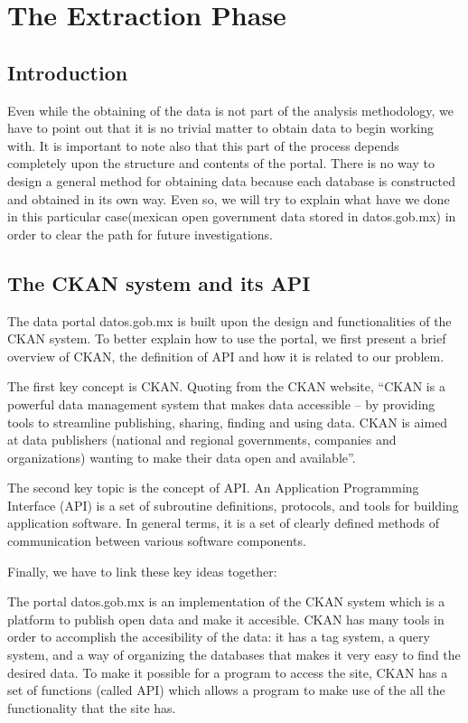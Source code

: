 \documentclass[]{book}
\begin{document}
\chapter{The Extraction Phase}\label{the-extraction-phase}

\section{Introduction}\label{introduction-1}

Even while the obtaining of the data is not part of the analysis
methodology, we have to point out that it is no trivial matter to obtain
data to begin working with. It is important to note also that this part
of the process depends completely upon the structure and contents of the
portal. There is no way to design a general method for obtaining data
because each database is constructed and obtained in its own way. Even
so, we will try to explain what have we done in this particular
case(mexican open government data stored in datos.gob.mx) in order to
clear the path for future investigations.

\section{The CKAN system and its API}\label{the-ckan-system-and-its-api}

The data portal datos.gob.mx is built upon the design and
functionalities of the CKAN system. To better explain how to use the
portal, we first present a brief overview of CKAN, the definition of API
and how it is related to our problem.

The first key concept is CKAN. Quoting from the CKAN website, ``CKAN is
a powerful data management system that makes data accessible -- by
providing tools to streamline publishing, sharing, finding and using
data. CKAN is aimed at data publishers (national and regional
governments, companies and organizations) wanting to make their data
open and available''.

The second key topic is the concept of API. An Application Programming
Interface (API) is a set of subroutine definitions, protocols, and tools
for building application software. In general terms, it is a set of
clearly defined methods of communication between various software
components.

Finally, we have to link these key ideas together:

The portal datos.gob.mx is an implementation of the CKAN system which is
a platform to publish open data and make it accesible. CKAN has many
tools in order to accomplish the accesibility of the data: it has a tag
system, a query system, and a way of organizing the databases that makes
it very easy to find the desired data. To make it possible for a program
to access the site, CKAN has a set of functions (called API) which
allows a program to make use of the all the functionality that the site
has.
\end{document}
